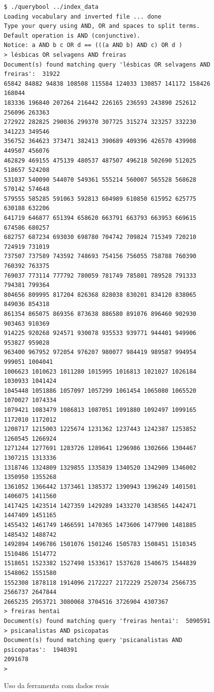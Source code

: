 \documentclass[10pt,twocolumn]{article}
\begin{document}
\begin{figure}
\begin{center}
\begin{verbatim}
$ ./querybool ../index_data
Loading vocabulary and inverted file ... done
Type your query using AND, OR and spaces to split terms.
Default operation is AND (conjunctive).
Notice: a AND b c OR d == (((a AND b) AND c) OR d )
> lésbicas OR selvagens AND freiras
Document(s) found matching query 'lésbicas OR selvagens AND freiras':  31922
65842 84882 94838 108508 115584 124033 130857 141172 158426 168044
183336 196840 207264 216442 226165 236593 243890 252612 256096 263363
272922 282825 290036 299370 307725 315274 323257 332230 341223 349546
356752 364623 373471 382413 390689 409396 426570 439908 449507 456076
462829 469155 475139 480537 487507 496218 502690 512025 518657 524208
531037 540090 544070 549361 555214 560007 565528 568628 570142 574648
579555 585285 591063 592813 604989 610850 615952 625775 630188 632206
641719 646877 651394 658620 663791 663793 663953 669615 674586 680257
682757 687234 693030 698780 704742 709824 715349 720210 724919 731019
737507 737589 743592 748693 754156 756055 758788 760390 760392 763375
769037 773114 777792 780059 781749 785801 789528 791333 794381 799364
804656 809995 817204 826368 828038 830201 834120 838065 849036 854318
861354 865075 869356 873638 886580 891076 896460 902930 903463 910369
914225 920268 924571 930078 935533 939771 944401 949906 953827 959028
963400 967952 972054 976207 980077 984419 989587 994954 999051 1004041
1006623 1010623 1011280 1015995 1016813 1021027 1026184 1030933 1041424
1045448 1051886 1057097 1057299 1061454 1065080 1065520 1070027 1074334
1079421 1083479 1086813 1087051 1091880 1092497 1099165 1172010 1172012
1208717 1215003 1225674 1231362 1237443 1242387 1253852 1260545 1266924
1271244 1277691 1283726 1289641 1296986 1302666 1304467 1307215 1313336
1318746 1324809 1329855 1335839 1340520 1342909 1346002 1350950 1355268
1361052 1366442 1373461 1385372 1390943 1396249 1401501 1406075 1411560
1417425 1423514 1427359 1429289 1433270 1438565 1442471 1447409 1451165
1455432 1461749 1466591 1470365 1473606 1477900 1481885 1485432 1488742
1492894 1496786 1501076 1501246 1505783 1508451 1510345 1510486 1514772
1518651 1523382 1527498 1533617 1537628 1540675 1544839 1548062 1551580
1552308 1878118 1914096 2172227 2172229 2520734 2566735 2566737 2647844
2665235 2953721 3080068 3704516 3726904 4307367
> freiras hentai
Document(s) found matching query 'freiras hentai':  5090591
> psicanalistas AND psicopatas
Document(s) found matching query 'psicanalistas AND psicopatas':  1940391
2091678
>
\end{verbatim}
\caption{Uso da ferramenta com dados reais}
\label{fig:real}
\end{center}
\end{figure}
\end{document}
